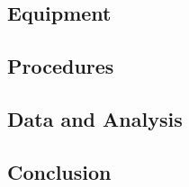 \documentclass{article}
\begin{document}
\qq

\subsection{Equipment}

\qq

\subsection{Procedures}

\qq

\subsection{Data and Analysis}

\qq

\subsection{Conclusion}

\qq

\end{document}
